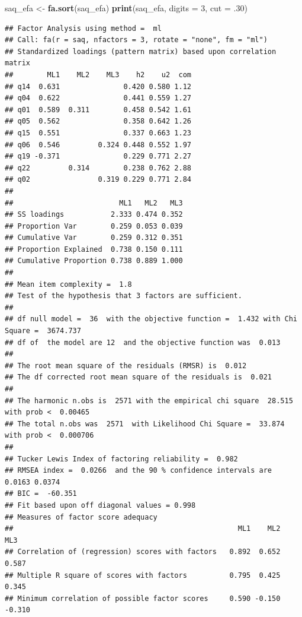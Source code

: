 \documentclass[
]{book}
\newenvironment{Shaded}{\begin{snugshade}}{\end{snugshade}}
\newcommand{\AttributeTok}[1]{\textcolor[rgb]{0.13,0.29,0.53}{#1}}
\newcommand{\DecValTok}[1]{\textcolor[rgb]{0.00,0.00,0.81}{#1}}
\newcommand{\FunctionTok}[1]{\textcolor[rgb]{0.13,0.29,0.53}{\textbf{#1}}}
\newcommand{\NormalTok}[1]{#1}
\newcommand{\OtherTok}[1]{\textcolor[rgb]{0.56,0.35,0.01}{#1}}
\begin{document}
\begin{Shaded}
\begin{Highlighting}[]
\NormalTok{saq\_efa }\OtherTok{\textless{}{-}} \FunctionTok{fa.sort}\NormalTok{(saq\_efa) }
\FunctionTok{print}\NormalTok{(saq\_efa, }\AttributeTok{digits =} \DecValTok{3}\NormalTok{, }\AttributeTok{cut =}\NormalTok{ .}\DecValTok{30}\NormalTok{)}
\end{Highlighting}
\end{Shaded}

\begin{verbatim}
## Factor Analysis using method =  ml
## Call: fa(r = saq, nfactors = 3, rotate = "none", fm = "ml")
## Standardized loadings (pattern matrix) based upon correlation matrix
##        ML1    ML2    ML3    h2    u2  com
## q14  0.631               0.420 0.580 1.12
## q04  0.622               0.441 0.559 1.27
## q01  0.589  0.311        0.458 0.542 1.61
## q05  0.562               0.358 0.642 1.26
## q15  0.551               0.337 0.663 1.23
## q06  0.546         0.324 0.448 0.552 1.97
## q19 -0.371               0.229 0.771 2.27
## q22         0.314        0.238 0.762 2.88
## q02                0.319 0.229 0.771 2.84
## 
##                         ML1   ML2   ML3
## SS loadings           2.333 0.474 0.352
## Proportion Var        0.259 0.053 0.039
## Cumulative Var        0.259 0.312 0.351
## Proportion Explained  0.738 0.150 0.111
## Cumulative Proportion 0.738 0.889 1.000
## 
## Mean item complexity =  1.8
## Test of the hypothesis that 3 factors are sufficient.
## 
## df null model =  36  with the objective function =  1.432 with Chi Square =  3674.737
## df of  the model are 12  and the objective function was  0.013 
## 
## The root mean square of the residuals (RMSR) is  0.012 
## The df corrected root mean square of the residuals is  0.021 
## 
## The harmonic n.obs is  2571 with the empirical chi square  28.515  with prob <  0.00465 
## The total n.obs was  2571  with Likelihood Chi Square =  33.874  with prob <  0.000706 
## 
## Tucker Lewis Index of factoring reliability =  0.982
## RMSEA index =  0.0266  and the 90 % confidence intervals are  0.0163 0.0374
## BIC =  -60.351
## Fit based upon off diagonal values = 0.998
## Measures of factor score adequacy             
##                                                     ML1    ML2    ML3
## Correlation of (regression) scores with factors   0.892  0.652  0.587
## Multiple R square of scores with factors          0.795  0.425  0.345
## Minimum correlation of possible factor scores     0.590 -0.150 -0.310
\end{verbatim}
\end{document}
